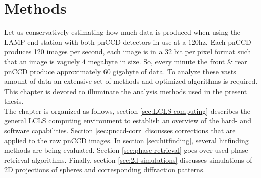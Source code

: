 \chapter{Methods}\label{ch:methods}
Let us conservatively estimating  how much data is produced when using the LAMP end-station with both pnCCD detectors in use at a $120$hz. Each pnCCD produces 120 images per second, each image is in a 32 bit per pixel format such that an image is vaguely $4$ megabyte in size. So, every minute the front \& rear pnCCD produce approximately $60$ gigabyte of data. To analyze these vasts amount of data an extensive set of methods and optimized algorithms is required. This chapter is devoted to illuminate the analysis methods used in the present thesis.\\
The chapter is organized as follows, section \ref{sec:LCLS-computing} describes the general LCLS computing environment to establish an overview of the hard- and software capabilities. Section \ref{sec:pnccd-corr} discusses corrections that are applied to the raw pnCCD images. In section \ref{sec:hitfinding}, several hitfinding methods are being evaluated. Section \ref{sec:phase-retrieval} goes over used phase-retrieval algorithms. Finally, section \ref{sec:2d-simulations} discusses simulations of 2D projections of spheres and corresponding diffraction patterns.
%
%
%
